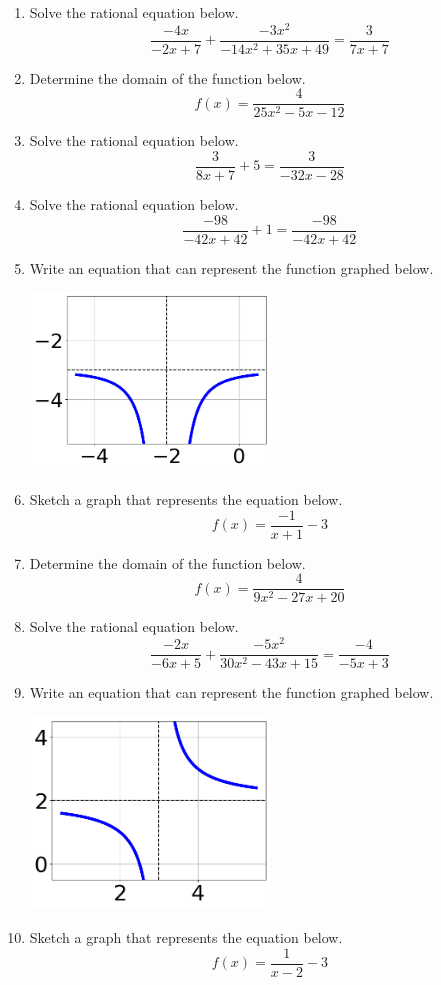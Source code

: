 \documentclass[14pt]{extbook}
\begin{document}
\begin{enumerate}
\item{
Solve the rational equation below.\[ \frac{-4x}{-2x + 7} + \frac{-3x^{2}}{-14x^{2} +35 x + 49} = \frac{3}{7x + 7} \]} \newpage
\item{
Determine the domain of the function below.\[ f(x) = \frac{4}{25x^{2} -5 x -12} \]} \newpage
\item{
Solve the rational equation below.\[ \frac{3}{8x + 7} + 5 = \frac{3}{-32x -28} \]} \newpage
\item{
Solve the rational equation below.\[ \frac{-98}{-42x + 42} + 1 = \frac{-98}{-42x + 42} \]} \newpage
\item{
Write an equation that can represent the function graphed below.
\begin{center}
    \includegraphics[width=0.5\textwidth]{../Figures/rationalGraphToEquationB.png}
\end{center}
} \newpage
\item{
Sketch a graph that represents the equation below.\[ f(x) = \frac{-1}{x + 1} - 3 \]} \newpage
\item{
Determine the domain of the function below.\[ f(x) = \frac{4}{9x^{2} -27 x + 20} \]} \newpage
\item{
Solve the rational equation below.\[ \frac{-2x}{-6x + 5} + \frac{-5x^{2}}{30x^{2} -43 x + 15} = \frac{-4}{-5x + 3} \]} \newpage
\item{
Write an equation that can represent the function graphed below.
\begin{center}
    \includegraphics[width=0.5\textwidth]{../Figures/rationalGraphToEquationCopyB.png}
\end{center}
} \newpage
\item{
Sketch a graph that represents the equation below.\[ f(x) = \frac{1}{x - 2} - 3 \]} \newpage
\end{enumerate}
\end{document}
